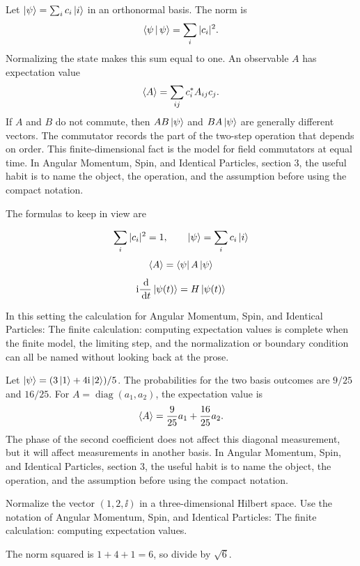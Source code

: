 Let \(\left|\psi\right\rangle=\sum_i c_i\left|i\right\rangle\) in an orthonormal basis.  The norm is
\[
  \left\langle \psi\,\middle|\,\psi\right\rangle=\sum_i |c_i|^2.
\]
Normalizing the state makes this sum equal to one.  An observable \(A\) has expectation value
\[
  \left\langle A\right\rangle=\sum_{ij}c_i^*A_{ij}c_j.
\]
If \(A\) and \(B\) do not commute, then \(AB\left|\psi\right\rangle\) and \(BA\left|\psi\right\rangle\) are generally different vectors.  The commutator records the part of the two-step operation that depends on order.  This finite-dimensional fact is the model for field commutators at equal time.  In Angular Momentum, Spin, and Identical Particles, section 3, the useful habit is to name the object, the operation, and the assumption before using the compact notation.

The formulas to keep in view are

\[
  \sum_i |c_i|^2=1,\qquad \left|\psi\right\rangle=\sum_i c_i\left|i\right\rangle
\]
\[
  \left\langle A\right\rangle=\left\langle \psi\right|A\left|\psi\right\rangle
\]
\[
  \mathrm i\frac{\,\mathrm d}{\,\mathrm d t}\left|\psi(t)\right\rangle=H\left|\psi(t)\right\rangle
\]

In this setting the calculation for Angular Momentum, Spin, and Identical Particles: The finite calculation: computing expectation values is complete when the finite model, the limiting step, and the normalization or boundary condition can all be named without looking back at the prose.




\begin{example}
Let \(\left|\psi\right\rangle=(3\left|1\right\rangle+4\mathrm i\left|2\right\rangle)/5\).  The probabilities for the two basis outcomes are \(9/25\) and \(16/25\).  For \(A=\operatorname{diag}(a_1,a_2)\), the expectation value is
\[
  \left\langle A\right\rangle=\frac{9}{25}a_1+\frac{16}{25}a_2.
\]
The phase of the second coefficient does not affect this diagonal measurement, but it will affect measurements in another basis.  In Angular Momentum, Spin, and Identical Particles, section 3, the useful habit is to name the object, the operation, and the assumption before using the compact notation.
\end{example}



\begin{exercise}
Normalize the vector \((1,2,\ii)\) in a three-dimensional Hilbert space.  Use the notation of Angular Momentum, Spin, and Identical Particles: The finite calculation: computing expectation values.
\begin{answer}
The norm squared is \(1+4+1=6\), so divide by \(\sqrt6\).
\end{answer}
\end{exercise}

